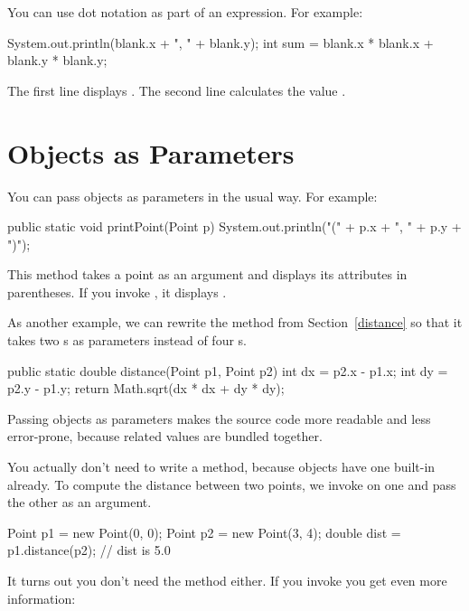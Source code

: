 You can use dot notation as part of an expression.
For example:

\begin{code}
System.out.println(blank.x + ", " + blank.y);
int sum = blank.x * blank.x + blank.y * blank.y;
\end{code}

The first line displays .
The second line calculates the value .


\section{Objects as Parameters}


You can pass objects as parameters in the usual way.
For example:

\begin{code}
public static void printPoint(Point p) {
    System.out.println("(" + p.x + ", " + p.y + ")");
}
\end{code}

This method takes a point as an argument and displays its attributes in parentheses.
If you invoke , it displays .

As another example, we can rewrite the  method from Section~\ref{distance} so that it takes two s as parameters instead of four s.

\begin{code}
public static double distance(Point p1, Point p2) {
    int dx = p2.x - p1.x;
    int dy = p2.y - p1.y;
    return Math.sqrt(dx * dx + dy * dy);
}
\end{code}

Passing objects as parameters makes the source code more readable and less error-prone, because related values are bundled together.

You actually don't need to write a  method, because  objects have one built-in already.
To compute the distance between two points, we invoke  on one and pass the other as an argument.

\begin{code}
Point p1 = new Point(0, 0);
Point p2 = new Point(3, 4);
double dist = p1.distance(p2);  // dist is 5.0
\end{code}

It turns out you don't need the  method either.
If you invoke  you get even more information:

